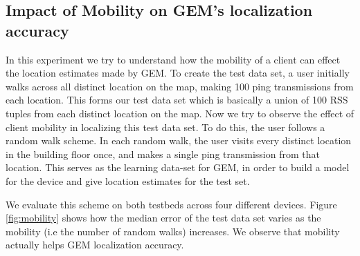 \subsection{Impact of Mobility on GEM's localization accuracy}
\label{subsec:impactofmobilityongemslocalizationaccuracy}

In this experiment we try to understand how the mobility of a client can effect the location estimates made by GEM. To create the test data set, a user initially walks across all distinct location on the map, making 100 ping transmissions from each location. This forms our test data set which is basically a union of 100 RSS tuples from each distinct location on the map.  Now we try to observe the effect of client mobility in localizing this test data set. To do this, the user follows a random walk scheme. In each random walk, the user visits every distinct location in the building floor once, and makes a single ping transmission from that location. This serves as the learning data-set for GEM, in order to build a model for the device and give location estimates for the test set. 

We evaluate this scheme on both testbeds across four different devices. Figure \ref{fig:mobility} shows how the median error of the test data set varies as the mobility (i.e the number of random walks) increases. We observe that mobility actually helps GEM localization accuracy.

